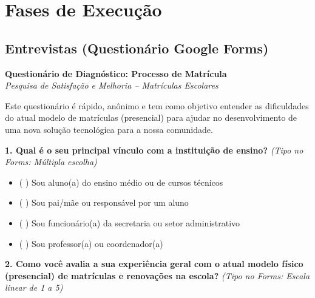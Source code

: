 \documentclass[12pt,a4paper]{article}
\begin{document}
\newpage


\section{Fases de Execução}

\subsection{Entrevistas (Questionário Google Forms)}

\noindent \textbf{Questionário de Diagnóstico: Processo de Matrícula}\\

\textit{Pesquisa de Satisfação e Melhoria -- Matrículas Escolares}

\vspace{0.2cm}

\noindent Este questionário é rápido, anônimo e tem como objetivo entender as dificuldades do atual modelo de matrículas (presencial) para ajudar no desenvolvimento de uma nova solução tecnológica para a nossa comunidade.

\vspace{0.3cm}

\noindent \textbf{1. Qual é o seu principal vínculo com a instituição de ensino?} \textit{(Tipo no Forms: Múltipla escolha)}

\begin{itemize}[leftmargin=1.0cm, noitemsep]

    \item ( ) Sou aluno(a) do ensino médio ou de cursos técnicos

    \item ( ) Sou pai/mãe ou responsável por um aluno

    \item ( ) Sou funcionário(a) da secretaria ou setor administrativo

    \item ( ) Sou professor(a) ou coordenador(a)

\end{itemize}

\vspace{0.2cm}

\noindent \textbf{2. Como você avalia a sua experiência geral com o atual modelo físico (presencial) de matrículas e renovações na escola?} \textit{(Tipo no Forms: Escala linear de 1 a 5)}
\end{document}

